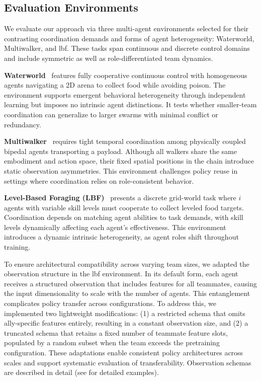 \documentclass{article}
\begin{document}
\subsection{Evaluation Environments} 

We evaluate our approach via three multi-agent environments selected for their contrasting 
coordination demands and forms of agent heterogeneity: 
Waterworld, Multiwalker, and \gls{lbf}. These tasks span continuous 
and discrete control domains and include symmetric as well as role-differentiated team dynamics.

\textbf{Waterworld}~\cite{gupta2017} features fully cooperative continuous control 
with homogeneous agents navigating a 2D arena to collect food while avoiding poison. 
The environment supports emergent behavioral heterogeneity through independent learning 
but imposes no intrinsic agent distinctions. It tests whether smaller-team coordination 
can generalize to larger swarms with minimal conflict or redundancy.

\textbf{Multiwalker}~\cite{gupta2017} requires tight temporal coordination among physically 
coupled bipedal agents transporting a payload. Although all walkers share the same embodiment 
and action space, their fixed spatial positions in the chain introduce static observation 
asymmetries. This environment challenges policy reuse in settings where coordination relies 
on role-consistent behavior.

\textbf{Level-Based Foraging (LBF)}~\cite{papoudakis2021} presents a discrete grid-world task 
where \(i\) agents with variable skill levels must cooperate to collect leveled food targets. 
Coordination depends on matching agent abilities to task demands, with skill levels 
dynamically affecting each agent's effectiveness. This environment introduces a dynamic 
intrinsic heterogeneity, as agent roles shift throughout training.

To ensure architectural compatibility across varying team sizes, we adapted the observation 
structure in the \gls{lbf} environment. In its default form, 
each agent receives a structured observation that includes features for all teammates, 
causing the input dimensionality to scale with the number of agents. 
This entanglement complicates policy transfer across configurations. 
To address this, we implemented two lightweight modifications: 
(1) a restricted schema that omits ally-specific features entirely, 
resulting in a constant observation size, and 
(2) a truncated schema that retains a fixed number of teammate feature slots, 
populated by a random subset when the team exceeds the pretraining configuration. 
These adaptations enable consistent policy architectures across scales and support 
systematic evaluation of transferability.
Observation schemas are described in detail
(see  for detailed examples).
\end{document}
